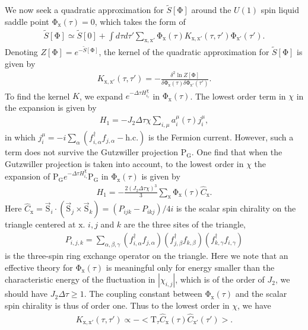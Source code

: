 \documentclass[12pt]{article}
\begin{document}
We now seek a quadratic approximation for $\tilde{S}[\mathrm{\Phi}]$ around the $U(1)$ spin liquid saddle point $\mathrm{\Phi}_{\mathrm{x}}(\tau)=0$, which takes the form of
\begin{eqnarray}
\tilde{S}[\mathrm{\Phi}]\simeq \tilde{S}[0]+\int d\tau d\tau' \sum_{\mathrm{x,x'}} \mathrm{\Phi}_{\mathrm{x}}(\tau) K_{\mathrm{x,x'}}(\tau,\tau') \mathrm{\Phi}_{\mathrm{x'}}(\tau').\nonumber
\end{eqnarray}
Denoting $Z[\mathrm{\Phi}]=e^{-\tilde{S}[\mathrm{\Phi}]}$, the kernel of the quadratic approximation for $\tilde{S}[\mathrm{\Phi}]$ is given by
\begin{eqnarray}
K_{\mathrm{x,x'}}(\tau,\tau')= - \frac{\delta^{2} \ln Z[\mathrm{\Phi}]}{\delta\mathrm{\Phi}_{\mathrm{x}}(\tau)\delta\mathrm{\Phi}_{\mathrm{x}'}(\tau')}. \nonumber
\end{eqnarray}
To find the kernel $K$, we expand $e^{-\Delta\tau H^{\chi}_{i_{\tau}}}$ in $\mathrm{\Phi}_{\mathrm{x}}(\tau)$. The lowest order term in $\chi$ in the expansion is given by 
\begin{eqnarray}
H_{1}=-J_{2}\Delta\tau\chi  \sum_{i,\mu}a^{\mu}_{i}(\tau)j^{\mu}_{i},\nonumber
\end{eqnarray}
in which $j^{\mu}_{i}=-i\sum_{\alpha}(f^{\dagger}_{i,\alpha}f_{j,\alpha}-\mathrm{h.c.})$
is the Fermion current. However, such a term does not survive the Gutzwiller projection $\mathrm{P_{G}}$. One find that when the Gutzwiller projection is taken into account, to the lowest order in $\chi$ the expansion of $\mathrm{P_{G}}e^{-\Delta\tau H^{\chi}_{i_{\tau}}}\mathrm{P_{G}}$ in $\mathrm{\Phi}_{\mathrm{x}}(\tau)$ is  given by
\begin{eqnarray}
H_{1}=-\frac{2(J_{2}\Delta\tau\chi)^{3}}{3} \sum_{\mathrm{x}}\mathrm{\Phi}_{\mathrm{x}}(\tau)\hat{C}_{\mathrm{x}}.\nonumber
\end{eqnarray}
Here $\hat{C}_{\mathrm{x}}=\vec{\mathrm{S}}_{i}\cdot(\vec{\mathrm{S}}_{j}\times\vec{\mathrm{S}}_{k})=(P_{ijk}-P_{ikj})/4i$ is the scalar spin chirality on the triangle centered at $\mathrm{x}$. $i,j$ and $k$ are the three sites of the triangle,
\begin{eqnarray}
P_{i,j,k}=\sum_{\alpha,\beta,\gamma}(f^{\dagger}_{i,\alpha}f_{j,\alpha})(f^{\dagger}_{j,\beta}f_{k,\beta})(f^{\dagger}_{k,\gamma}f_{i,\gamma})\nonumber
\end{eqnarray}
is the three-spin ring exchange operator on the triangle. Here we note that an effective theory for $\mathrm{\Phi}_{\mathrm{x}}(\tau)$ is meaningful only for energy smaller than the characteristic energy of the fluctuation in $|\chi_{i,j}|$, which is of the order of $J_{2}$, we should have $J_{2}\Delta\tau\geq 1$. The coupling constant between $\mathrm{\Phi}_{\mathrm{x}}(\tau)$ and the scalar spin chirality is thus of order one. Thus to the lowest order in $\chi$, we have
\begin{eqnarray}
K_{\mathrm{x,x'}}(\tau,\tau')\propto -<\mathrm{T}_{\tau}\hat{C}_{\mathrm{x}}(\tau)\hat{C}_{\mathrm{x'}}(\tau')>.\nonumber
\end{eqnarray}
\end{document}
